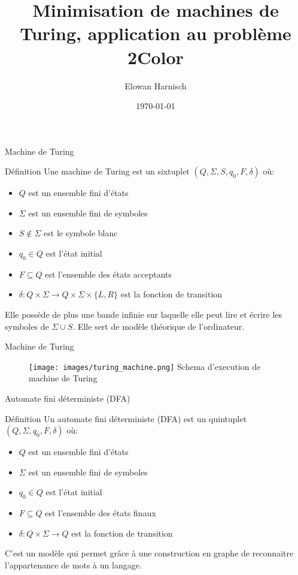 \documentclass{beamer}
\title{Minimisation de machines de Turing, application au problème 2Color}
\date{\today}
\author{Elowan Harnisch}
\begin{document}
    \maketitle
    \begin{frame}{Machine de Turing}
        \begin{alert}{Définition}
            Une machine de Turing est un sixtuplet $(Q, \Sigma, S, q_0, F, \delta)$ où:
            \begin{itemize}
                \item $Q$ est un ensemble fini d'états
                \item $\Sigma$ est un ensemble fini de symboles
                \item $S \notin \Sigma$ est le symbole blanc
                \item $q_0 \in Q$ est l'état initial
                \item $F \subseteq Q$ est l'ensemble des états acceptants
                \item $\delta: Q \times \Sigma \rightarrow Q \times \Sigma \times \{L, R\}$ est la fonction de 
                transition
            \end{itemize}
            Elle possède de plus une bande infinie sur laquelle elle peut
            lire et écrire les symboles de $\Sigma \cup {S}$. Elle sert de 
            modèle théorique de l'ordinateur.
        \end{alert}
    \end{frame}
    \begin{frame}{Machine de Turing}
        \begin{figure}
            \texttt{[image: images/turing\_machine.png]}
            Schema d'execution de machine de Turing
        \end{figure}
    \end{frame}
    \begin{frame}{Automate fini déterministe (DFA)}
        \begin{alert}{Définition}
            Un automate fini déterministe (DFA) est un quintuplet 
            $(Q, \Sigma, q_0, F, \delta)$ où:
            \begin{itemize}
                \item $Q$ est un ensemble fini d'états
                \item $\Sigma$ est un ensemble fini de symboles
                \item $q_0 \in Q$ est l'état initial
                \item $F \subseteq Q$ est l'ensemble des états finaux
                \item $\delta: Q \times \Sigma \rightarrow Q$ est la 
                fonction de transition
            \end{itemize}
            C'est un modèle qui permet grâce à une construction en graphe de 
            reconnaitre l'appartenance de mots à un langage. 
        \end{alert}
    \end{frame}
\end{document}

